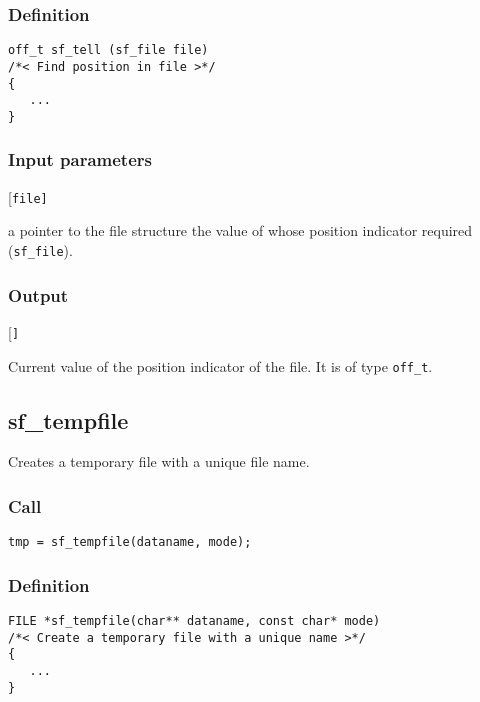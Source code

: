 \subsubsection*{Definition}
\begin{verbatim}
off_t sf_tell (sf_file file)
/*< Find position in file >*/
{
   ...
}
\end{verbatim}

\subsubsection*{Input parameters}
\begin{desclist}{\tt }{\quad}[\tt file]
   \setlength\itemsep{0pt}
   \item[file] a pointer to the file structure the value of whose position indicator required (\texttt{sf\_file}).
\end{desclist}                 

\subsubsection*{Output}
\begin{desclist}{\tt }{\quad}[\tt ]
   \setlength\itemsep{0pt}
   \item[] Current value of the position indicator of the file. It is of type \texttt{off\_t}.
\end{desclist}




\subsection{{sf\_tempfile}}
Creates a temporary file with a unique file name.

\subsubsection*{Call}
\begin{verbatim}tmp = sf_tempfile(dataname, mode);\end{verbatim}

\subsubsection*{Definition}
\begin{verbatim}
FILE *sf_tempfile(char** dataname, const char* mode)
/*< Create a temporary file with a unique name >*/
{
   ...
}
\end{verbatim}

